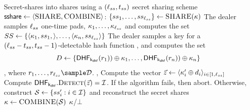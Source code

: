 \begin{algorithm}
\caption{\detectableSecretSharingScheme: detectable secret sharing scheme}
\footnotesize
\begin{algorithmic}[1]

\State Secret-shares \genericSymmKey into \secretShareLength shares using a $(\ell_{ss}, t_{ss})$ secret sharing scheme $\mathsf{sshare} \gets \langle \textsc{SHARE}, \textsc{COMBINE}\rangle$: $\{ ss_{1}, \dots, ss_{\ell_{ss}} \} \gets \textsc{SHARE}(\kappa)$
\State The dealer samples $\ell_{ss}$ one-time pads, $\kappa_1, \dots, \kappa_{\ell_{ss}}$ and computes the set $SS \gets \{\langle \kappa_1, ss_{1}, \rangle, \dots, \langle \kappa_n, ss_{\ell_{ss}} \rangle \}$
\State The dealer samples a key for a $(\ell_{ss} - t_{ss}, t_{ss} - 1)$-detectable hash function \dhfKey, and computes the set $$\dhfSet \assign \{\dhf[\dhfKey](\genericRand[1])) \oplus \genericSymmKey_1, \dots, \dhf[\dhfKey](\genericRand[n]))\oplus \genericSymmKey_n\}$$, where $\genericRand[1], \dots, \genericRand[\secretShareLength] \sample \dhfDomain$.
\State \Return \ssSet, \dhfSet
\EndProcedure
\Statex
{}
\State Compute the vector $\genericVec \assign \langle \genericSymmKey_\setIdx' \oplus \dhfSetElmt{\setIdx}\rangle_{\setIdx \in [1, \secretShareLength]}$ 
\State Compute $\dhf[\dhfKey].\dhfDetect(\genericVec) =
    \matchedIndexSet$. If the algorithm fails, then abort. Otherwise, construct $\genericSetVar \assign \{ \secretShare{\setIdx}' :   \setIdx \in \matchedIndexSet \}$ and reconstruct the secret shares $\genericSymmKey \assign \SSCombine(\genericSetVar)$ 
\State \Return $\kappa$/$\bot$

\EndProcedure
\end{algorithmic}
\end{algorithm}

